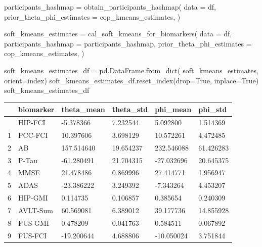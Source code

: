 \documentclass[
  letterpaper,
  DIV=11,
  numbers=noendperiod]{scrreprt}
\newenvironment{Shaded}{\begin{snugshade}}{\end{snugshade}}
\newcommand{\NormalTok}[1]{\textcolor[rgb]{0.00,0.23,0.31}{#1}}
\newcommand{\OperatorTok}[1]{\textcolor[rgb]{0.37,0.37,0.37}{#1}}
\newcommand{\StringTok}[1]{\textcolor[rgb]{0.13,0.47,0.30}{#1}}
\newcommand{\VariableTok}[1]{\textcolor[rgb]{0.07,0.07,0.07}{#1}}
\begin{document}
\begin{Shaded}
\begin{Highlighting}[]
\NormalTok{participants\_hashmap }\OperatorTok{=}\NormalTok{ obtain\_participants\_hashmap(}
\NormalTok{    data }\OperatorTok{=}\NormalTok{ df, }
\NormalTok{    prior\_theta\_phi\_estimates }\OperatorTok{=}\NormalTok{ cop\_kmeans\_estimates,}
\NormalTok{)}

\NormalTok{soft\_kmeans\_estimates }\OperatorTok{=}\NormalTok{ cal\_soft\_kmeans\_for\_biomarkers(}
\NormalTok{        data }\OperatorTok{=}\NormalTok{ df,}
\NormalTok{        participants\_hashmap }\OperatorTok{=}\NormalTok{ participants\_hashmap,}
\NormalTok{        prior\_theta\_phi\_estimates }\OperatorTok{=}\NormalTok{ cop\_kmeans\_estimates,}
\NormalTok{)}
\end{Highlighting}
\end{Shaded}

\begin{Shaded}
\begin{Highlighting}[]
\NormalTok{soft\_kmeans\_estimates\_df }\OperatorTok{=}\NormalTok{ pd.DataFrame.from\_dict(}
\NormalTok{    soft\_kmeans\_estimates, orient}\OperatorTok{=}\StringTok{\textquotesingle{}index\textquotesingle{}}\NormalTok{)}
\NormalTok{soft\_kmeans\_estimates\_df.reset\_index(drop}\OperatorTok{=}\VariableTok{True}\NormalTok{, inplace}\OperatorTok{=}\VariableTok{True}\NormalTok{)}
\NormalTok{soft\_kmeans\_estimates\_df}
\end{Highlighting}
\end{Shaded}

\begin{longtable}[]{@{}llllll@{}}
\toprule\noalign{}
& biomarker & theta\_mean & theta\_std & phi\_mean & phi\_std \\
\midrule\noalign{}
\endhead
\bottomrule\noalign{}
\endlastfoot
0 & HIP-FCI & -5.378366 & 7.232544 & 5.092800 & 1.514369 \\
1 & PCC-FCI & 10.397606 & 3.698129 & 10.572261 & 4.472485 \\
2 & AB & 157.514640 & 19.654237 & 232.546088 & 61.426283 \\
3 & P-Tau & -61.280491 & 21.704315 & -27.032696 & 20.645375 \\
4 & MMSE & 21.478486 & 0.869996 & 27.414771 & 1.956947 \\
5 & ADAS & -23.386222 & 3.249392 & -7.343264 & 4.453207 \\
6 & HIP-GMI & 0.114735 & 0.106857 & 0.385654 & 0.240309 \\
7 & AVLT-Sum & 60.569081 & 6.389012 & 39.177736 & 14.855928 \\
8 & FUS-GMI & 0.478209 & 0.041763 & 0.584511 & 0.067892 \\
9 & FUS-FCI & -19.200644 & 4.688806 & -10.050024 & 3.751844 \\
\end{longtable}
\end{document}
